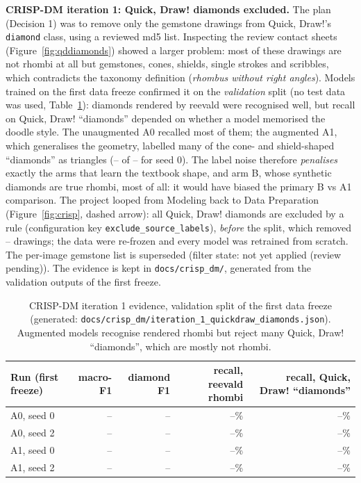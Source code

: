 \documentclass[11pt]{article}
\providecommand{\GemstoneFilterState}{not yet applied (review pending)}
\providecommand{\ExcludedByRule}{--}
\providecommand{\IterOneAZeroSeedZeroMacroFone}{--}
\providecommand{\IterOneAZeroSeedZeroDiamondFone}{--}
\providecommand{\IterOneAZeroSeedZeroQDRecall}{--}
\providecommand{\IterOneAZeroSeedZeroRenderRecall}{--}
\providecommand{\IterOneAZeroSeedZeroQDN}{--}
\providecommand{\IterOneAZeroSeedTwoMacroFone}{--}
\providecommand{\IterOneAZeroSeedTwoDiamondFone}{--}
\providecommand{\IterOneAZeroSeedTwoQDRecall}{--}
\providecommand{\IterOneAZeroSeedTwoRenderRecall}{--}
\providecommand{\IterOneAOneSeedZeroMacroFone}{--}
\providecommand{\IterOneAOneSeedZeroDiamondFone}{--}
\providecommand{\IterOneAOneSeedZeroQDRecall}{--}
\providecommand{\IterOneAOneSeedZeroRenderRecall}{--}
\providecommand{\IterOneAOneSeedZeroQDAsTriangle}{--}
\providecommand{\IterOneAOneSeedTwoMacroFone}{--}
\providecommand{\IterOneAOneSeedTwoDiamondFone}{--}
\providecommand{\IterOneAOneSeedTwoQDRecall}{--}
\providecommand{\IterOneAOneSeedTwoRenderRecall}{--}
\begin{document}
\textbf{CRISP-DM iteration 1: Quick, Draw! diamonds excluded.} The plan
(Decision 1) was to remove only the gemstone drawings from Quick, Draw!'s
\texttt{diamond} class, using a reviewed md5 list. Inspecting the review
contact sheets (Figure~\ref{fig:qddiamonds}) showed a larger problem: most of
these drawings are not rhombi at all but gemstones, cones, shields, single
strokes and scribbles, which contradicts the taxonomy definition
(\emph{rhombus without right angles}). Models trained on the first data
freeze confirmed it on the \emph{validation} split (no test data was used,
Table~\ref{tab:iter1}): diamonds rendered by reevald were recognised well, but
recall on Quick, Draw! ``diamonds'' depended on whether a model memorised the
doodle style. The unaugmented A0 recalled most of them; the augmented A1,
which generalises the geometry, labelled many of the cone- and
shield-shaped ``diamonds'' as triangles (\IterOneAOneSeedZeroQDAsTriangle{} of
\IterOneAZeroSeedZeroQDN{} for seed 0). The label noise therefore
\emph{penalises} exactly the arms that learn the textbook shape, and arm B,
whose synthetic diamonds are true rhombi, most of all: it would have biased
the primary B vs A1 comparison. The project looped from Modeling back to Data
Preparation (Figure~\ref{fig:crisp}, dashed arrow): all Quick, Draw!
diamonds are excluded by a rule (configuration key
\texttt{exclude\_source\_labels}), \emph{before} the split, which removed
\ExcludedByRule{} drawings; the data were re-frozen and every model was
retrained from scratch. The per-image gemstone list is superseded (filter
state: \GemstoneFilterState). The evidence is kept in
\nolinkurl{docs/crisp_dm/}, generated from the validation outputs of the
first freeze.

\begin{table}[H]
\centering\footnotesize
\begin{tabular}{lrrrr}
\toprule
Run (first freeze) & macro-F1 & diamond F1 & recall, reevald rhombi & recall, Quick, Draw! ``diamonds'' \\
\midrule
A0, seed 0 & \IterOneAZeroSeedZeroMacroFone & \IterOneAZeroSeedZeroDiamondFone & \IterOneAZeroSeedZeroRenderRecall\% & \IterOneAZeroSeedZeroQDRecall\% \\
A0, seed 2 & \IterOneAZeroSeedTwoMacroFone & \IterOneAZeroSeedTwoDiamondFone & \IterOneAZeroSeedTwoRenderRecall\% & \IterOneAZeroSeedTwoQDRecall\% \\
A1, seed 0 & \IterOneAOneSeedZeroMacroFone & \IterOneAOneSeedZeroDiamondFone & \IterOneAOneSeedZeroRenderRecall\% & \IterOneAOneSeedZeroQDRecall\% \\
A1, seed 2 & \IterOneAOneSeedTwoMacroFone & \IterOneAOneSeedTwoDiamondFone & \IterOneAOneSeedTwoRenderRecall\% & \IterOneAOneSeedTwoQDRecall\% \\
\bottomrule
\end{tabular}
\caption{CRISP-DM iteration 1 evidence, validation split of the first data
freeze (generated: \nolinkurl{docs/crisp_dm/iteration_1_quickdraw_diamonds.json}).
Augmented models recognise rendered rhombi but reject many Quick, Draw!
``diamonds'', which are mostly not rhombi.}
\label{tab:iter1}
\end{table}
\end{document}
